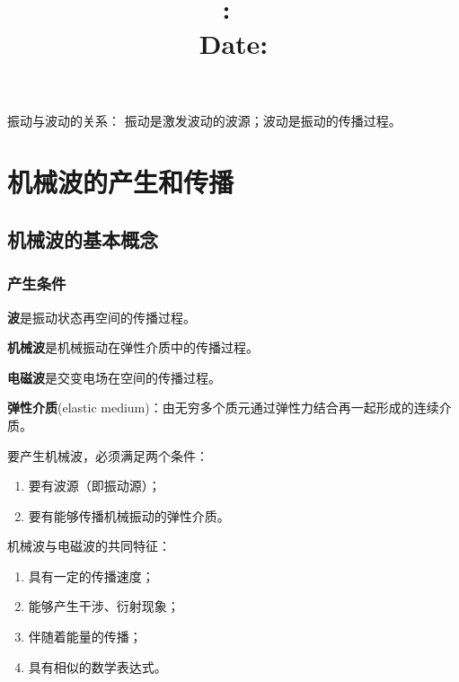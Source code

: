 \documentclass[12pt, a4paper]{article}
\title{
    \vspace{2in}
    \textmd{\textbf{\hmwkClass:\ \hmwkTitle}}\\
    \normalsize\vspace{0.1in}\small{Date: \hmwkDueDate}\\
    \vspace{0.1in}\large{\textit{\myUniversiy}}
    \vspace{3in}
}
\author{\hmwkAuthorName}
\date{}
\numberwithin{equation}{section}
\begin{document}
\maketitle

\pagebreak


\tableofcontents


\pagebreak


\pagebreak

    振动与波动的关系：
    振动是激发波动的波源；波动是振动的传播过程。

\section{机械波的产生和传播}

\subsection{机械波的基本概念}

\subsubsection{产生条件}

    \textbf{波}是振动状态再空间的传播过程。

    \textbf{机械波}是机械振动在弹性介质中的传播过程。

    \textbf{电磁波}是交变电场在空间的传播过程。

    \textbf{弹性介质}(elastic medium)：由无穷多个质元通过弹性力结合再一起形成的连续介质。

    要产生机械波，必须满足两个条件：

    \begin{enumerate}
        \item 要有波源（即振动源）；
        \item 要有能够传播机械振动的弹性介质。
    \end{enumerate}

    机械波与电磁波的共同特征：

    \begin{enumerate}
        \item 具有一定的传播速度；
        \item 能够产生干涉、衍射现象；
        \item 伴随着能量的传播；
        \item 具有相似的数学表达式。
    \end{enumerate}
\end{document}
